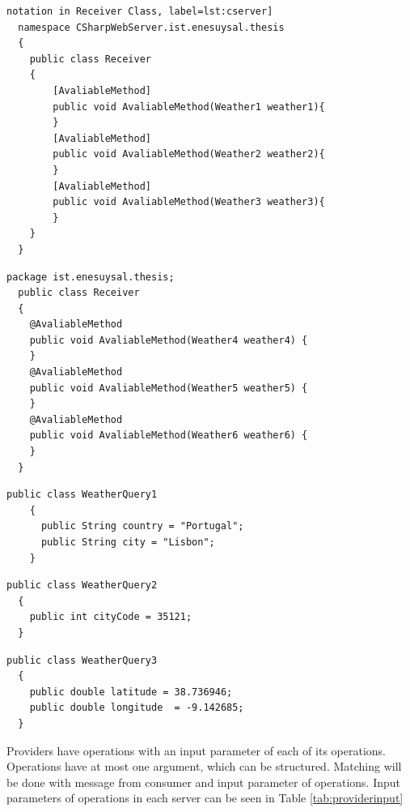 \begin{lstlisting}[caption=.Net provider [AvaliableMethod] notation in Receiver Class, label=lst:cserver]
  namespace CSharpWebServer.ist.enesuysal.thesis
  {
    public class Receiver
    {
        [AvaliableMethod]
        public void AvaliableMethod(Weather1 weather1){
        }
        [AvaliableMethod]
        public void AvaliableMethod(Weather2 weather2){
        }
        [AvaliableMethod]
        public void AvaliableMethod(Weather3 weather3){
        }
    }
  }
\end{lstlisting}

\begin{lstlisting}[caption=Java provider @AvaliableMethod notation in Receiver Class, label=lst:jaserver]
  package ist.enesuysal.thesis;
  public class Receiver
  {
    @AvaliableMethod
    public void AvaliableMethod(Weather4 weather4) {
    }
    @AvaliableMethod
    public void AvaliableMethod(Weather5 weather5) {
    }
    @AvaliableMethod
    public void AvaliableMethod(Weather6 weather6) {
    }
  }
\end{lstlisting}

\begin{lstlisting}[caption=Details of Query1 Object, label=lst:query1]
    public class WeatherQuery1
    {
      public String country = "Portugal";
      public String city = "Lisbon";
    }
\end{lstlisting}
\begin{lstlisting}[caption=Details of Query2 Object, label=lst:query2]
  public class WeatherQuery2
  {
    public int cityCode = 35121;
  }
\end{lstlisting}

\begin{lstlisting}[caption=Details of Query3 Object, label=lst:query3]
  public class WeatherQuery3
  {
    public double latitude = 38.736946;
    public double longitude  = -9.142685;
  }
\end{lstlisting}

Providers have operations with an input parameter of each of its operations. Operations have at most one argument, which can be structured. Matching will be done with message from consumer and input parameter of operations.  Input parameters of operations in each server can be seen in Table \ref{tab:providerinput}

